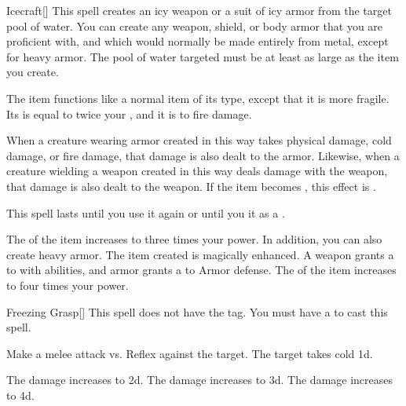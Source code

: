 \lowercase{\hypertarget{spell:Icecraft}{}}\label{spell:Icecraft}
\begin{freeability}[Rank 1]{\hypertarget{spell:Icecraft}{Icecraft}}[]
This spell creates an icy weapon or a suit of icy armor from the target pool of water.
You can create any weapon, shield, or body armor that you are proficient with, and which would normally be made entirely from metal, except for heavy armor.
The pool of water targeted must be at least as large as the item you create.

The item functions like a normal item of its type, except that it is more fragile.
Its  is equal to twice your , and it is  to fire damage.

When a creature wearing armor created in this way takes physical damage, cold damage, or fire damage, that damage is also dealt to the armor.
Likewise, when a creature wielding a weapon created in this way deals damage with the weapon, that damage is also dealt to the weapon.
If the item becomes , this effect is .

This spell lasts until you use it again or until you  it as a .

\rankline
{} The  of the item increases to three times your power.
In addition, you can also create heavy armor.
 The item created is magically enhanced.
A weapon grants a   to  with  abilities,
and armor grants a   to Armor defense.
 The  of the item increases to four times your power.

\end{freeability}
\vspace{0.25em}



\lowercase{\hypertarget{spell:Freezing Grasp}{}}\label{spell:Freezing Grasp}
\begin{freeability}[Rank 2]{\hypertarget{spell:Freezing Grasp}{Freezing Grasp}}[]
This spell does not have the  tag.
You must have a  to cast this spell.

Make a melee attack vs. Reflex against the target.
\hit The target takes cold  \plus1d.

\rankline
{} The damage increases to  \plus2d.
 The damage increases to  \plus3d.
 The damage increases to  \plus4d.

\end{freeability}
\vspace{0.25em}



